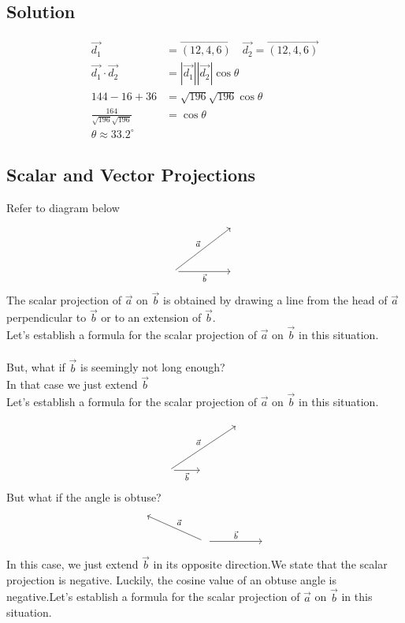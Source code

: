 \documentclass{article}
\begin{document}
\subsection*{Solution}
\begin{align*}
    \vec{d_1}&=\overrightarrow{(12,4,6)} \quad \vec{d_2}=\overrightarrow{(12,4,6)}\\
    \vec{d_1}\cdot \vec{d_2}&=|\vec{d_1}||\vec{d_2}|\cos\theta\\
    144-16+36&=\sqrt{196}\sqrt{196}\cos \theta\\
    \frac{164}{\sqrt{196}\sqrt{196}}&=\cos \theta\\
    \theta \approx 33.2^{\circ} 
\end{align*}

\newpage 

\subsection{Scalar and Vector Projections}
Refer to diagram below
\[\begin{tikzcd}
	&& {} \\
	\\
	{} && {}
	\arrow["{\vec{a}}", from=3-1, to=1-3]
	\arrow["{\vec{b}}"', from=3-1, to=3-3]
\end{tikzcd}\]
The scalar projection of $\vec{a}$ on $\vec{b}$ is obtained by drawing a line from the head of $\vec{a}$ perpendicular to $\vec{b}$ or to an extension of $\vec{b}$.\\
Let’s establish a formula for the scalar projection of $\vec{a}$ on $\vec{b}$ in this situation.\\\\
But, what if $\vec{b}$ is seemingly not long enough?\\
In that case we just extend $\vec{b}$\\
Let’s establish a formula for the scalar projection of $\vec{a}$ on $\vec{b}$ in this situation. 

\[\begin{tikzcd}
	&& {} \\
	\\
	{} & {}
	\arrow["{\vec{a}}", from=3-1, to=1-3]
	\arrow["{\vec{b}}"', from=3-1, to=3-2]
\end{tikzcd}\]
But what if the angle is obtuse?\\
\[\begin{tikzcd}
{} \\
&& {} && {}
\arrow["{\vec{a}}"', from=2-3, to=1-1]
\arrow["{\vec{b}}", from=2-3, to=2-5]
\end{tikzcd}\]
In this case, we just extend $\vec{b}$ in its opposite direction.We state that the scalar projection is negative. Luckily, the cosine value of an obtuse angle is negative.Let’s establish a formula for the scalar projection of $\vec{a}$ on $\vec{b}$ in this situation.\\
\end{document}
